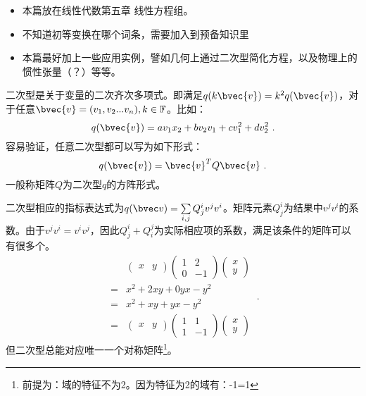 
\begin{issues}
\issueTODO 
\begin{itemize}
\item 本篇放在线性代数第五章 线性方程组。
\item 不知道初等变换在哪个词条，需要加入到预备知识里
\item  本篇最好加上一些应用实例，譬如几何上通过二次型简化方程，以及物理上的惯性张量（？）等等。
\end{itemize}
\end{issues}
\begin{definition}{}
二次型是关于变量的二次齐次多项式。即满足$q(k\bvec{v})=k^2 q(\bvec{v})$，对于任意$\bvec{v}=(v_1,v_2...v_n),k\in \mathbb F$。比如：
\begin{equation}
q(\bvec{v})=av_1x_2+bv_2v_1+cv_1^2+dv_2^2~.
\end{equation}
容易验证，任意二次型都可以写为如下形式：
\begin{equation}
q(\bvec{v})=\bvec{v}^TQ\bvec{v}~.
\end{equation}
一般称矩阵$Q$为二次型$q$的方阵形式。
\end{definition}

二次型相应的指标表达式为$q(\bvec v)=\sum\limits_{i,j}Q^i_j v^j v^i$。矩阵元素$Q^i_j$为结果中$v^j v^i$的系数。由于$v^j v^i=v^i v^j$，因此$Q^i_j+Q^j_i$为实际相应项的系数，满足该条件的矩阵可以有很多个。
\begin{equation}
\begin{aligned}
& \left(\begin{array}{ll}
x & y
\end{array}\right)\left(\begin{array}{cc}
1 & 2 \\
0 & -1
\end{array}\right)\left(\begin{array}{l}
x \\
y
\end{array}\right) \\
= & x^2+2 x y+0 y x-y^2 \\
= & x^2+x y+y x-y^2 \\
= & \left(\begin{array}{ll}
x & y
\end{array}\right)\left(\begin{array}{cc}
1 & 1 \\
1 & -1
\end{array}\right)\left(\begin{array}{l}
x \\
y
\end{array}\right)
\end{aligned}~.
\end{equation}
但二次型总能对应唯一一个对称矩阵\footnote{前提为：域的特征不为2。因为特征为2的域有：-1=1}。
